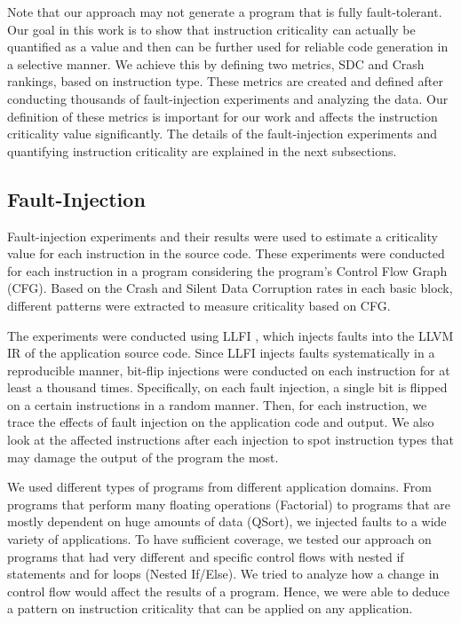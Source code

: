 Note that our approach may not generate a program that is fully fault-tolerant. Our goal in this work is to show that instruction criticality can actually be quantified as a value and then can be further used for reliable code generation in a selective manner. We achieve this by defining two metrics, SDC and Crash rankings, based on instruction type. These metrics are created and defined after conducting thousands of fault-injection experiments and analyzing the data. Our definition of these metrics is important for our work and affects the instruction criticality value significantly. The details of the fault-injection experiments and quantifying instruction criticality are explained in the next subsections. 


\subsection{Fault-Injection}

Fault-injection experiments and their results were used to estimate a criticality value for each instruction in the source code. These experiments were conducted for each instruction in a program considering the program's Control Flow Graph (CFG). Based on the Crash and Silent Data Corruption rates in each basic block, different patterns were extracted to measure criticality based on CFG. 

The experiments were conducted using LLFI \cite{LLFI:2015}, which injects faults into the LLVM IR of the application source code. Since LLFI injects faults systematically in a reproducible manner, bit-flip injections were conducted on each instruction for at least a thousand times. Specifically, on each fault injection, a single bit is flipped on a certain instructions in a random manner. Then, for each instruction, we trace the effects of fault injection on the application code and output. We also look at the affected instructions after each injection to spot instruction types that may damage the output of the program the most. 

We used different types of programs from different application domains. From programs that perform many floating operations (Factorial) to programs that are mostly dependent on huge amounts of data (QSort), we injected faults to a wide variety of applications. To have sufficient coverage, we tested our approach on programs that had very different and specific control flows with nested if statements and for loops (Nested If/Else). We tried to analyze how a change in control flow would affect the results of a program. Hence, we were able to deduce a pattern on instruction criticality that can be applied on any application.
 
